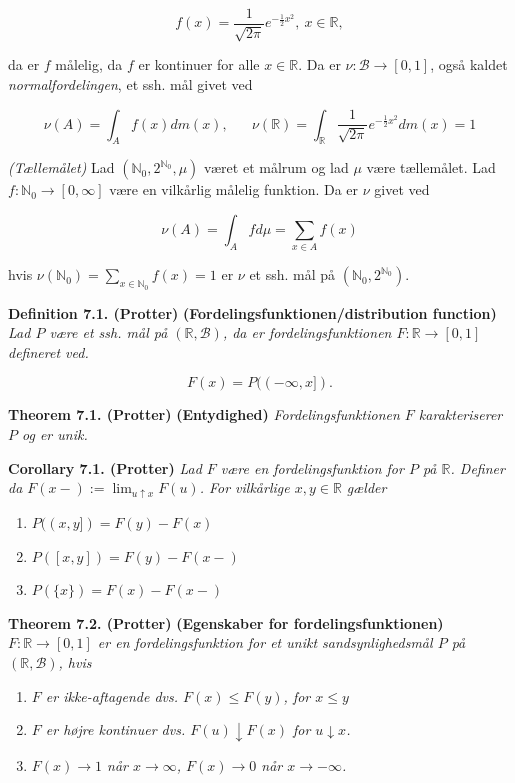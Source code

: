 \documentclass[
]{book}
\providecommand{\tightlist}{%
  \setlength{\itemsep}{0pt}\setlength{\parskip}{0pt}}
\begin{document}
\[
f(x)=\frac{1}{\sqrt{2\pi}}e^{-\frac{1}{2}x^2},\ x\in\mathbb{R},
\]

da er \(f\) målelig, da \(f\) er kontinuer for alle \(x\in\mathbb{R}\). Da er \(\nu : \mathcal{B} \to [0,1]\), også kaldet \emph{normalfordelingen}, et ssh. mål givet ved

\[
\nu(A)=\int_A f(x) dm(x),\hspace{20pt} \nu(\mathbb{R})=\int_{\mathbb{R}}\frac{1}{\sqrt{2\pi}}e^{-\frac{1}{2}x^2}dm(x)=1
\]

\emph{(Tællemålet)} Lad \((\mathbb{N}_0,2^{\mathbb{N}_0},\mu)\) været et målrum og lad \(\mu\) være tællemålet. Lad \(f : \mathbb{N}_0 \to [0,\infty]\) være en vilkårlig målelig funktion. Da er \(\nu\) givet ved

\[
\nu(A)=\int_A fd\mu=\sum_{x\in A}f(x)
\]

hvis \(\nu(\mathbb{N}_0)=\sum_{x\in\mathbb{N}_0}f(x)=1\) er \(\nu\) et ssh. mål på \((\mathbb{N}_0,2^{\mathbb{N}_0})\).

\textbf{Definition 7.1. (Protter)} \textbf{(Fordelingsfunktionen/distribution function)} \emph{Lad \(P\) være et ssh. mål på \((\mathbb{R},\mathcal{B})\), da er fordelingsfunktionen \(F : \mathbb{R}\to [0,1]\) defineret ved.}

\[
F(x)=P((-\infty,x]).
\]

\textbf{Theorem 7.1. (Protter)} \textbf{(Entydighed)} \emph{Fordelingsfunktionen \(F\) karakteriserer \(P\) og er unik.}

\textbf{Corollary 7.1. (Protter)} \emph{Lad \(F\) være en fordelingsfunktion for \(P\) på \(\mathbb{R}\). Definer da \(F(x-):=\lim_{u\uparrow x}F(u)\). For vilkårlige \(x,y\in\mathbb{R}\) gælder}

\begin{enumerate}
\def\labelenumi{\roman{enumi}.}
\tightlist
\item
  \(P((x,y])=F(y)-F(x)\)
\item
  \(P([x,y])=F(y)-F(x-)\)
\item
  \(P(\{x\})=F(x)-F(x-)\)
\end{enumerate}

\textbf{Theorem 7.2. (Protter)} \textbf{(Egenskaber for fordelingsfunktionen)} \emph{\(F : \mathbb{R} \to [0,1]\) er en fordelingsfunktion for et unikt sandsynlighedsmål \(P\) på \((\mathbb{R},\mathcal{B})\), hvis}

\begin{enumerate}
\def\labelenumi{\roman{enumi}.}
\tightlist
\item
  \emph{\(F\) er ikke-aftagende dvs. \(F(x)\le F(y)\), for \(x\le y\)}
\item
  \emph{\(F\) er højre kontinuer dvs. \(F(u)\downarrow F(x)\) for \(u\downarrow x\).}
\item
  \emph{\(F(x)\to 1\) når \(x\to \infty\), \(F(x)\to 0\) når \(x\to -\infty\).}
\end{enumerate}
\end{document}
